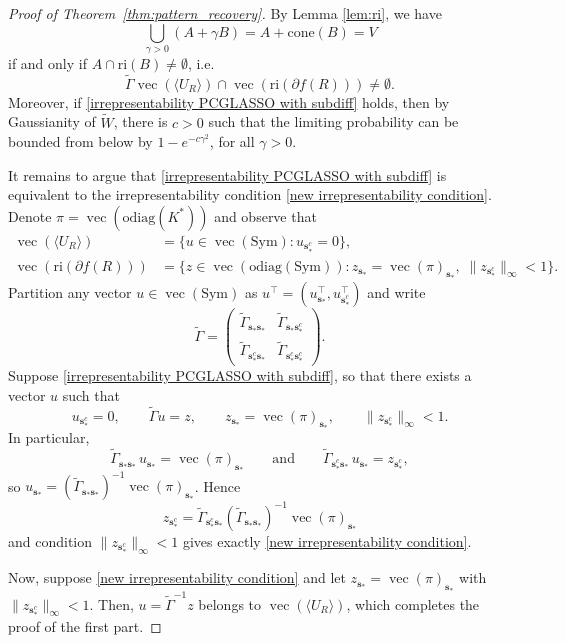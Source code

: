 \documentclass[12pt]{amsart}
\numberwithin{equation}{section}
\numberwithin{equation}{section}
\theoremstyle{plain}
\theoremstyle{definition}
\newcommand{\odiag}[1]{\mathrm{odiag}(#1)}
\newcommand{\Sym}{\mathrm{Sym}}
\newcommand{\Supp}{\mathbf{s}_\ast}
\begin{document}
\begin{proof}[Proof of Theorem~\ref{thm:pattern_recovery}]
By Lemma \ref{lem:ri}, we have 
\[
\bigcup_{\gamma>0}(A+\gamma B) = A + \mathrm{cone}(B) = V  
\]
if and only if $A\cap \mathrm{ri}(B)\neq \emptyset$, i.e.
\begin{equation}\label{irrepresentability PCGLASSO with subdiff}
    \tilde\Gamma \operatorname{vec}(\langle U_{R}\rangle)\cap \operatorname{vec}(\mathrm{ri}(\partial f(R)))\neq \emptyset.
\end{equation}
Moreover, if \eqref{irrepresentability PCGLASSO with subdiff} holds, then by Gaussianity of $\tilde{W}$, there is $c>0$ such that the limiting probability can be bounded from below by $1-e^{-c\gamma^2}$, for all $\gamma>0$. 

It remains to argue that \eqref{irrepresentability PCGLASSO with subdiff} is equivalent to the irrepresentability condition \eqref{new irrepresentability condition}. Denote $\pi=\operatorname{vec}(\odiag{K^\ast})$ and observe that 
\begin{align*}
\operatorname{vec}(\langle U_R\rangle)
&=\{u\in\operatorname{vec}(\Sym)\colon u_{\Supp^c}=0\},\\
\operatorname{vec}(\mathrm{ri}(\partial f(R)))
&=\{z\in\operatorname{vec}(\odiag{\Sym})\colon z_{\Supp}=\operatorname{vec}(\pi)_{\Supp},\;\|z_{\Supp^c}\|_\infty<1\}.
\end{align*}
Partition any vector $u\in\operatorname{vec}(\Sym)$ as $u^\top=(u_{\Supp}^\top ,u_{\Supp^c}^\top)$ and write
\[
\tilde\Gamma
=\begin{pmatrix}\tilde\Gamma_{\Supp\Supp}&\tilde\Gamma_{\Supp\Supp^c}\\
                \tilde\Gamma_{\Supp^c\Supp}&\tilde\Gamma_{\Supp^c\Supp^c}\end{pmatrix}.
\]
Suppose \eqref{irrepresentability PCGLASSO with subdiff}, so that there exists a vector $u$ such that 
\[
u_{\Supp^c}=0,\qquad \tilde\Gamma u=z,\qquad z_{\Supp}=\operatorname{vec}(\pi)_{\Supp},\qquad \|z_{\Supp^c}\|_\infty <1.
\]
In particular, 
\[
\tilde\Gamma_{\Supp\Supp}\,u_{\Supp}=\operatorname{vec}(\pi)_{\Supp}\qquad\mbox{and}\qquad
\tilde\Gamma_{\Supp^c\Supp}\,u_{\Supp}=z_{\Supp^c},
\]
so $u_{\Supp}=(\tilde\Gamma_{\Supp\Supp})^{-1}\operatorname{vec}(\pi)_{\Supp}$. Hence
\[
z_{\Supp^c}
=\tilde\Gamma_{\Supp^c\Supp}(\tilde\Gamma_{\Supp\Supp})^{-1}\operatorname{vec}(\pi)_{\Supp}
\]
and condition $\|z_{\Supp^c}\|_\infty<1$ gives exactly \eqref{new irrepresentability condition}. 

Now, suppose \eqref{new irrepresentability condition} and let  $z_{\Supp}=\operatorname{vec}(\pi)_{\Supp}$  with $\|z_{\Supp^c}\|_\infty<1$. Then, $u=\tilde{\Gamma}^{-1} z$ belongs to $\operatorname{vec}(\langle U_R\rangle)$, which completes the proof of the first part. 


\end{proof}
\end{document}
